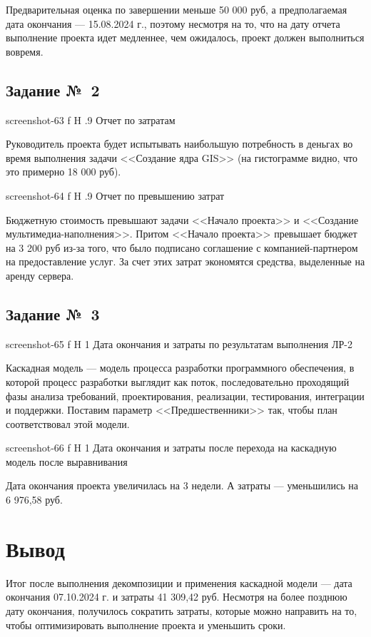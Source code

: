 \documentclass{bmstu}
\begin{document}
Предварительная оценка по завершении меньше 50 000 руб, а предполагаемая дата окончания --- 15.08.2024 г., поэтому несмотря на то, что на дату отчета выполнение проекта идет медленнее, чем ожидалось, проект должен выполниться вовремя.
    
\subsection{Задание №~2}
    
    {screenshot-63}
    {f}
    {H}
    {.9\textwidth}
    {Отчет по затратам}
    
Руководитель проекта будет испытывать наибольшую потребность в деньгах во время выполнения задачи <<Создание ядра GIS>> (на гистограмме видно, что это примерно 18 000 руб).

    {screenshot-64}
    {f}
    {H}
    {.9\textwidth}
    {Отчет по превышению затрат}
    
Бюджетную стоимость превышают задачи <<Начало проекта>> и <<Создание мультимедиа-наполнения>>. 
Притом <<Начало проекта>> превышает бюджет на 3 200 руб из-за того, что было подписано соглашение с компанией-партнером на предоставление услуг. 
За счет этих затрат экономятся средства, выделенные на аренду сервера.

\subsection{Задание №~3}

    {screenshot-65}
    {f}
    {H}
    {1\textwidth}
    {Дата окончания и затраты по результатам выполнения ЛР-2}
    
Каскадная модель --- модель процесса разработки программного обеспечения, в которой процесс разработки выглядит как поток, последовательно проходящий фазы анализа требований, проектирования, реализации, тестирования, интеграции и поддержки. 
Поставим параметр <<Предшественники>> так, чтобы план соответствовал этой модели.
    
    {screenshot-66}
    {f}
    {H}
    {1\textwidth}
    {Дата окончания и затраты после перехода на каскадную модель после выравнивания}

Дата окончания проекта увеличилась на 3 недели. 
А затраты --- уменьшились на 6 976,58 руб. 
    
\section{Вывод}

Итог после выполнения декомпозиции и применения каскадной модели --- дата окончания 07.10.2024 г. и затраты 41 309,42 руб. 
Несмотря на более позднюю дату окончания, получилось сократить затраты, которые можно направить на то, чтобы оптимизировать выполнение проекта и уменьшить сроки.
\end{document}
